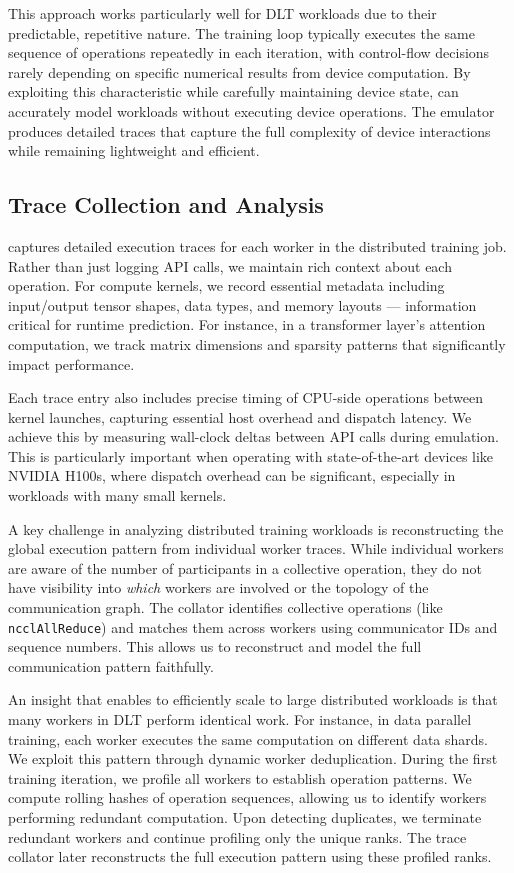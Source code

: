 This approach works particularly well for DLT workloads due to their predictable, repetitive nature. The training loop typically executes the same sequence of operations repeatedly in each iteration, with control-flow decisions rarely depending on specific numerical results from device computation. By exploiting this characteristic while carefully maintaining device state, \sysname can accurately model workloads without executing device operations. The emulator produces detailed traces that capture the full complexity of device interactions while remaining lightweight and efficient.

\subsection{Trace Collection and Analysis}

 \sysname captures detailed execution traces for each worker in the distributed training job. Rather than just logging API calls, we maintain rich context about each operation. For compute kernels, we record essential metadata including input/output tensor shapes, data types, and memory layouts --- information critical for runtime prediction. For instance, in a transformer layer's attention computation, we track matrix dimensions and sparsity patterns that significantly impact performance.

Each trace entry also includes precise timing of CPU-side operations between kernel launches, capturing essential host overhead and dispatch latency. We achieve this by measuring wall-clock deltas between API calls during emulation. This is particularly important when operating with state-of-the-art devices like NVIDIA H100s, where dispatch overhead can be significant, especially in workloads with many small kernels.

 A key challenge in analyzing distributed training workloads is reconstructing the global execution pattern from individual worker traces. While individual workers are aware of the number of participants in a collective operation, they do not have visibility into \textit{which} workers are involved or the topology of the communication graph. The collator identifies collective operations (like \texttt{ncclAllReduce}) and matches them across workers using communicator IDs and sequence numbers. This allows us to reconstruct and model the full communication pattern faithfully.

\label{sec:deduplication}
 An insight that enables \sysname to efficiently scale to large distributed workloads is that many workers in DLT perform identical work. For instance, in data parallel training, each worker executes the same computation on different data shards. We exploit this pattern through dynamic worker deduplication. During the first training iteration, we profile all workers to establish operation patterns. We compute rolling hashes of operation sequences, allowing us to identify workers performing redundant computation. Upon detecting duplicates, we terminate redundant workers and continue profiling only the unique ranks. The trace collator later reconstructs the full execution pattern using these profiled ranks.

